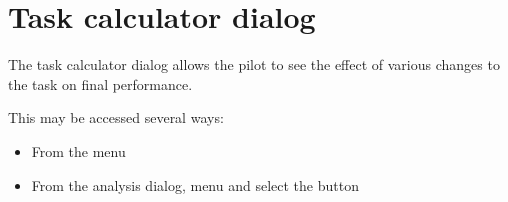 \documentclass[a4paper,12pt]{refrep}
\begin{document}







\section{Task calculator dialog}\label{sec:task-calc-dial}
The task calculator dialog allows the pilot to see the effect of
various changes to the task on final performance.

This may be accessed several ways:
\begin{itemize}
\item From the menu 
\begin{quote}
\blink{}
\end{quote}
\item From the analysis dialog, menu \blink{} and select
 the button 
\end{itemize}
\end{document}
